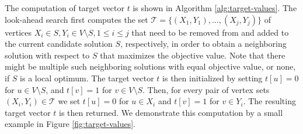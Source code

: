 \documentclass[draft,final]{vutinfth} %
\begin{document}
The computation of target vector $t$ is shown in Algorithm \ref{alg:target-values}.
The look-ahead search first computes the set $\mathcal{T} = \{(X_1, Y_1), \dots, (X_j, Y_j)\}$ of vertices $X_i \in S, Y_i \in V \setminus S, 1 \leq i \leq j$ that need to be removed from and added to the current candidate solution $S$, respectively, in order to obtain a neighboring solution with respect to $S$ that maximizes the objective value. 
Note that there might be multiple such neighboring solutions with equal objective value, or none, if $S$ is a local optimum. 
The target vector $t$ is then initialized by setting $t[u] = 0$ for $u \in V \setminus S$, and $t[v] = 1$ for $v \in V \setminus S$. Then, for every pair of vertex sets $(X_i, Y_i) \in \mathcal{T}$ we set $t[u] = 0$ for $u \in X_i$ and $t[v] = 1$ for $v \in Y_i$. The resulting target vector $t$ is then returned. 
We demonstrate this computation by a small example in Figure \ref{fig:target-values}. 


\end{document}
